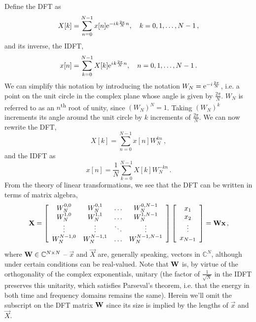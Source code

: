 Define the DFT as
%
\begin{equation}
  X[k] = \sum_{n=0}^{N-1}x[n]\mathrm{e}^{-{i\mkern1mu} k\frac{2\pi}{N}n},
  \quad k = 0,1,\hdots, N-1 \,,
\end{equation}
%
and its inverse, the IDFT,
%
\begin{equation}
  x[n] = \sum_{k=0}^{N-1}X[k]\mathrm{e}^{{i\mkern1mu} k\frac{2\pi}{N}n},
  \quad n = 0,1,\hdots, N-1 \,.
\end{equation}
%
We can simplify this notation by introducing the notation
$W_N=\mathrm{e}^{-{i\mkern1mu}\frac{2\pi}{N}}$, i.e. a point on the unit circle in the
complex plane whose angle is given by $\frac{2\pi}{N}$. $W_N$ is referred
to as an $n$\textsuperscript{th} root of unity, since $(W_N)^N = 1$.
Taking $(W_N)^k$ increments its angle around the unit circle by $k$
increments of $\frac{2\pi}{N}$. We can now rewrite the DFT,
%
\begin{equation}
  X[k] = \sum_{n=0}^{N-1}x[n]W_N^{kn} \,,
\end{equation}
%
and the IDFT as
%
\begin{equation}
  x[n] = \frac{1}{N}\sum_{k=0}^{N-1}X[k]W_N^{-kn} \,.
\end{equation}
%
From the theory of linear transformations, we see that the DFT can be
written in terms of matrix algebra,
%
\begin{displaymath}
  \mathbf{X}
  =
  \left[\begin{array}{cccc}
      W_N^{0,0} & W_N^{0,1} & \hdots & W_N^{0,N-1} \\
      W_N^{1,0} & W_N^{1,1} & \hdots & W_N^{1,N-1} \\
      \vdots & \vdots & \ddots & \vdots \\
      W_N^{N-1,0} & W_N^{N-1,1} & \hdots & W_N^{N-1,N-1}
  \end{array}\right]
  \left[\begin{array}{c}
      x_1 \\ x_2 \\ \vdots \\ x_{N-1}
  \end{array}\right]
  = \mathbf{W}\mathbf{x} \,,
\end{displaymath}
%
where $\mathbf{W}\in\mathbb{C}^{N\times N}$ -- $\vec{x}$ and $\vec{X}$ are,
generally speaking, vectors in $\mathbb{C}^N$, although under certain conditions
can be real-valued. Note that $\mathbf{W}$ is, by virtue of the orthogonality of
the complex exponentials, unitary (the factor of $\frac{1}{\sqrt{N}}$ in the
IDFT preserves this unitarity, which satisfies Parseval's theorem, i.e. that
the energy in both time and frequency domains remains the same). Herein we'll omit the
subscript on the DFT matrix $\mathbf{W}$ since its size is implied by the lengths of $\vec{x}$
and $\vec{X}$.\\

